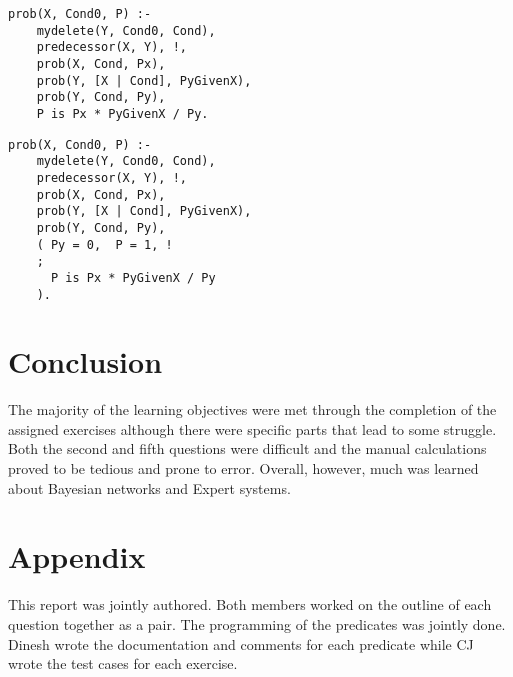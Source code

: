 \documentclass[11pt]{article}
\newcommand{\forceindent}{\leavevmode{\parindent=1em\indent}}
\begin{document}
\begin{itemize}
\begin{lstlisting}
prob(X, Cond0, P) :-
    mydelete(Y, Cond0, Cond),
    predecessor(X, Y), !,       
    prob(X, Cond, Px),
    prob(Y, [X | Cond], PyGivenX),
    prob(Y, Cond, Py),
    P is Px * PyGivenX / Py.   
\end{lstlisting}

\begin{lstlisting}
prob(X, Cond0, P) :-
    mydelete(Y, Cond0, Cond),
    predecessor(X, Y), !,      
    prob(X, Cond, Px),
    prob(Y, [X | Cond], PyGivenX),
    prob(Y, Cond, Py),
    ( Py = 0,  P = 1, !
    ; 
      P is Px * PyGivenX / Py   
    ).
\end{lstlisting}
\end{itemize}

\section{Conclusion}
\forceindent The majority of the learning objectives were met through the completion of the assigned exercises although there were specific parts that lead to some struggle. Both the second and fifth questions were difficult and the manual calculations proved to be tedious and prone to error. Overall, however, much was learned about Bayesian networks and Expert systems.
  

\section{Appendix}
\forceindent This report was jointly authored. Both members worked on the outline of each question together as a pair. The programming of the predicates was jointly done. Dinesh wrote the documentation and comments for each predicate while CJ wrote the test cases for each exercise.

\nocite{*}
\doublespacing
\renewcommand{\section}[2]{}%
\end{document}
